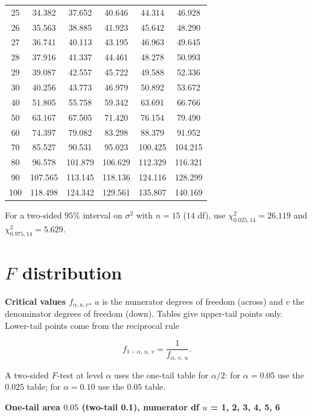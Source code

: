 \begin{center}
\begin{tabular}{c|ccccc}
25 & 34.382 & 37.652 & 40.646 & 44.314 & 46.928 \\
26 & 35.563 & 38.885 & 41.923 & 45.642 & 48.290 \\
27 & 36.741 & 40.113 & 43.195 & 46.963 & 49.645 \\
28 & 37.916 & 41.337 & 44.461 & 48.278 & 50.993 \\
29 & 39.087 & 42.557 & 45.722 & 49.588 & 52.336 \\
30 & 40.256 & 43.773 & 46.979 & 50.892 & 53.672 \\
40 & 51.805 & 55.758 & 59.342 & 63.691 & 66.766 \\
50 & 63.167 & 67.505 & 71.420 & 76.154 & 79.490 \\
60 & 74.397 & 79.082 & 83.298 & 88.379 & 91.952 \\
70 & 85.527 & 90.531 & 95.023 & 100.425 & 104.215 \\
80 & 96.578 & 101.879 & 106.629 & 112.329 & 116.321 \\
90 & 107.565 & 113.145 & 118.136 & 124.116 & 128.299 \\
100 & 118.498 & 124.342 & 129.561 & 135.807 & 140.169 \\
\bottomrule
\end{tabular}
\end{center}

For a two-sided $95\%$ interval on $\sigma^2$ with $n=15$ ($14$ df), use $\chi^2_{0.025,14}=26.119$ and $\chi^2_{0.975,14}=5.629$.

\section{$F$ distribution}

\textbf{Critical values $f_{\alpha,u,v}$.} $u$ is the numerator degrees of freedom (across) and $v$ the denominator degrees of freedom (down). Tables give upper-tail points only. Lower-tail points come from the reciprocal rule

\[ f_{1-\alpha,\,u,\,v}=\frac{1}{f_{\alpha,\,v,\,u}}. \]

A two-sided $F$-test at level $\alpha$ uses the one-tail table for $\alpha/2$: for $\alpha=0.05$ use the $0.025$ table; for $\alpha=0.10$ use the $0.05$ table.

\textbf{One-tail area $0.05$ (two-tail 0.1), numerator df $u$ = 1, 2, 3, 4, 5, 6}

